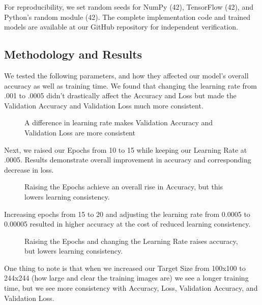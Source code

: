 \documentclass[conference]{IEEEtran}
\begin{document}
For reproducibility, we set random seeds for NumPy (42), TensorFlow (42), and Python's random module (42). The complete implementation code and trained models are available at our GitHub repository for independent verification.

\subsection{Methodology and Results}
We tested the following parameters, and how they affected our model's overall accuracy as well as training time. We found that changing the learning rate from .001 to .0005 didn’t drastically affect the Accuracy and Loss but made the Validation Accuracy and Validation Loss much more consistent.
\begin{figure}[htbp]
    \centering
    \caption{A difference in learning rate makes Validation Accuracy and Validation Loss are more consistent}
    \label{fig:1.4}
\end{figure}
\FloatBarrier 

\hfill \break
\hfill \break

Next, we raised our Epochs from 10 to 15 while keeping our Learning Rate at .0005.
Results demonstrate overall improvement in accuracy and corresponding decrease in loss.

\begin{figure}[htbp]
    \centering
    \caption{Raising the Epochs achieve an overall rise in Accuracy, but this lowers learning consistency. }
    \label{fig:1.4}
\end{figure}
\FloatBarrier 

Increasing epochs from 15 to 20 and adjusting the learning rate from 0.0005 to 0.00005 resulted in higher accuracy at the cost of reduced learning consistency.


\begin{figure}[htbp]
    \centering
    \caption{Raising the Epochs and changing the Learning Rate raises accuracy, but lowers learning consistency.}
    \label{fig:1.4}
\end{figure}
\FloatBarrier 

One thing to note is that when we increased our Target Size from 100x100 to 244x244 (how large and clear the training images are) we see a longer training time, but we see more consistency with Accuracy, Loss, Validation Accuracy, and Validation Loss.
\end{document}
